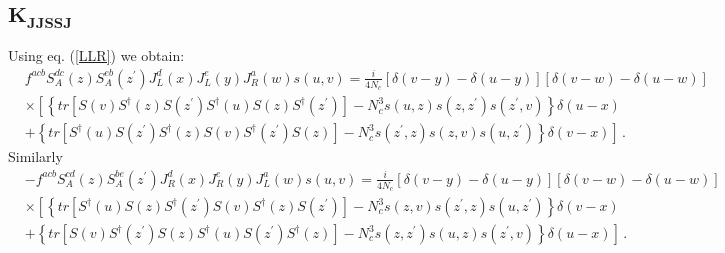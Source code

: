 \documentclass[11pt,a4paper]{article}
\begin{document}
\subsection*{$\mathbf{K_{JJSSJ}}$}
Using eq. (\ref{LLR})  we obtain:
\begin{equation}\begin{split}
&f^{acb}S_A^{dc}(z)S_A^{eb}(z^{\prime})J_{L}^{d}(x)J_{L}^{e}(y)J_{R}^{a}(w)s(u,v)=\frac{i}{4N_{c}}\left[\delta(v-y)-\delta(u-y)\right]\left[\delta(v-w)-\delta(u-w)\right]\\
&\times \left[\left\{ tr\left[S(v)S^{\dagger}(z)S(z^{\prime})S^{\dagger}(u)S(z)S^{\dagger}(z^{\prime})\right]-N_{c}^{3}s(u,z)s(z,z^{\prime})s(z^{\prime},v)\right\} \delta(u-x)\right.\\
&\left.+\left\{ tr\left[S^{\dagger}(u)S(z^{\prime})S^{\dagger}(z)S(v)S^{\dagger}(z^{\prime})S(z)\right]-N_{c}^{3}s(z^{\prime},z)s(z,v)s(u,z^{\prime})\right\} \delta(v-x)\right]\,.
 \end{split}\end{equation}
Similarly 
\begin{equation}\begin{split}
&-f^{acb}S_A^{cd}(z)S_A^{be}(z^{\prime})J_{R}^{d}(x)J_{R}^{e}(y)J_{L}^{a}(w)s(u,v)=\frac{i}{4N_{c}}\left[\delta(v-y)-\delta(u-y)\right]\left[\delta(v-w)-\delta(u-w)\right]\\
&\times \left[\left\{ tr\left[S^{\dagger}(u)S(z)S^{\dagger}(z^{\prime})S(v)S^{\dagger}(z)S(z^{\prime})\right]-N_{c}^{3}s(z,v)s(z^{\prime},z)s(u,z^{\prime})\right\} \delta(v-x)\right.\\
&\left.+\left\{ tr\left[S(v)S^{\dagger}(z^{\prime})S(z)S^{\dagger}(u)S(z^{\prime})S^{\dagger}(z)\right]-N_{c}^{3}s(z,z^{\prime})s(u,z)s(z^{\prime},v)\right\} \delta(u-x)\right]\,. \\
 \end{split}\end{equation}
\end{document}

